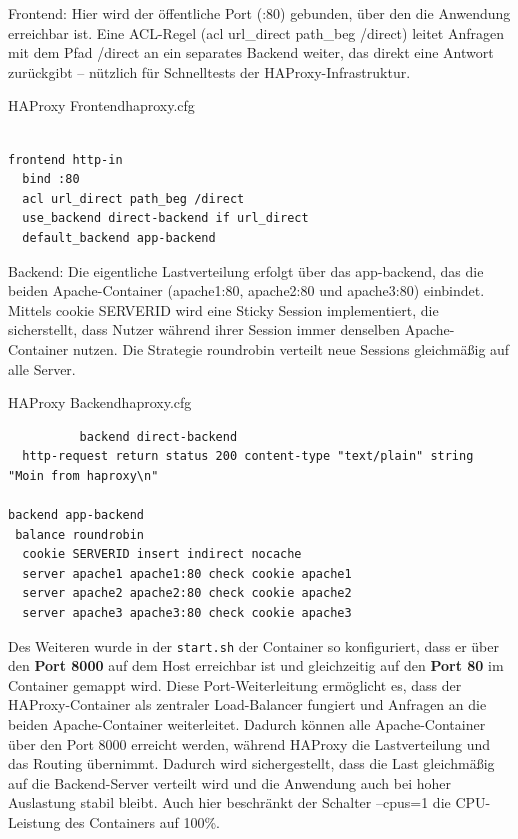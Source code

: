Frontend: Hier wird der öffentliche Port (:80) gebunden, über den die Anwendung erreichbar ist. Eine ACL-Regel (acl url\_direct path\_beg /direct) leitet Anfragen mit dem Pfad /direct an ein separates Backend weiter, das direkt eine Antwort zurückgibt – nützlich für Schnelltests der HAProxy-Infrastruktur.  

\begin{code}{HAProxy Frontend}{haproxy.cfg}
        \begin{verbatim}

frontend http-in
  bind :80
  acl url_direct path_beg /direct
  use_backend direct-backend if url_direct
  default_backend app-backend

        \end{verbatim}
\end{code}

Backend: Die eigentliche Lastverteilung erfolgt über das app-backend, das die beiden Apache-Container (apache1:80, apache2:80 und apache3:80) einbindet. Mittels cookie SERVERID wird eine Sticky Session implementiert, die sicherstellt, dass Nutzer während ihrer Session immer denselben Apache-Container nutzen. Die Strategie roundrobin verteilt neue Sessions gleichmäßig auf alle Server.  

\begin{code}{HAProxy Backend}{haproxy.cfg}
        \begin{verbatim}
          backend direct-backend
  http-request return status 200 content-type "text/plain" string "Moin from haproxy\n"

backend app-backend
 balance roundrobin
  cookie SERVERID insert indirect nocache
  server apache1 apache1:80 check cookie apache1
  server apache2 apache2:80 check cookie apache2
  server apache3 apache3:80 check cookie apache3
          \end{verbatim}
\end{code}

Des Weiteren wurde in der \texttt{start.sh} der Container so konfiguriert, dass er über den \textbf{Port 8000} auf dem Host erreichbar ist und gleichzeitig auf den \textbf{Port 80} im Container gemappt wird. Diese Port-Weiterleitung ermöglicht es, dass der HAProxy-Container als zentraler Load-Balancer fungiert und Anfragen an die beiden Apache-Container weiterleitet. Dadurch können alle Apache-Container über den Port 8000 erreicht werden, während HAProxy die Lastverteilung und das Routing übernimmt. Dadurch wird sichergestellt, dass die Last gleichmäßig auf die Backend-Server verteilt wird und die Anwendung auch bei hoher Auslastung stabil bleibt. Auch hier beschränkt der Schalter --cpus=1 die CPU-Leistung des Containers auf 100\%. 

